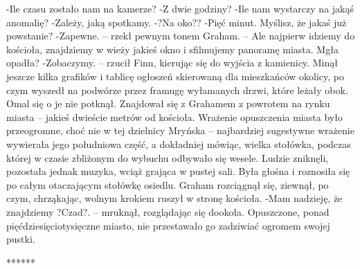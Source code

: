 \documentclass[../MAIN.tex]{subfiles}
\begin{document}
-Ile czasu zostało nam na kamerze?
-Z dwie godziny?
-Ile nam wystarczy na jakąś anomalię?
-Zależy, jaką spotkamy.
-?Na oko??
-Pięć minut. Myślisz, że jakaś już powstanie?
-Zapewne. -- rzekł pewnym tonem Graham. -- Ale najpierw idziemy do kościoła, znajdziemy w wieży jakieś okno i sfilmujemy panoramę miasta. Mgła opadła?
-Zobaczymy. -- rzucił Finn, kierując się do wyjścia z kamienicy. Minął jeszcze kilka grafików i tablicę ogłoszeń skierowaną dla mieszkańców okolicy, po czym wyszedł na podwórze przez framugę wyłamanych drzwi, które leżały obok. Omal się o je nie potknął.
Znajdował się z Grahamem z powrotem na rynku miasta -- jakieś dwieście metrów od kościoła. Wrażenie opuszczenia miasta było przeogromne, choć nie w tej dzielnicy Mryńska -- najbardziej sugestywne wrażenie wywierała jego południowa część, a dokładniej mówiąc, wielka stołówka, podczas której w czasie zbliżonym do wybuchu odbywało się wesele.
Ludzie zniknęli, pozostała jednak muzyka, wciąż grająca w pustej sali. Była głośna i roznosiła się po całym otaczającym stołówkę osiedlu.
Graham rozciągnął się, ziewnął, po czym, chrząkając, wolnym krokiem ruszył w stronę kościoła.
-Mam nadzieję, że znajdziemy ?Czad?. -- mruknął, rozglądając się dookoła.
Opuszczone, ponad pięćdziesięciotysięczne miasto, nie przestawało go zadziwiać ogromem swojej pustki.

******
\end{document}
